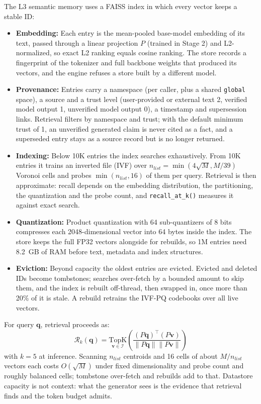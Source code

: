 \documentclass{article}
\begin{document}
The L3 semantic memory uses a FAISS index \cite{johnson2019faiss} in which every vector keeps a stable ID:
\begin{itemize}
    \item \textbf{Embedding:} Each entry is the mean-pooled base-model embedding of its text, passed through a linear projection $P$ (trained in Stage 2) and L2-normalized, so exact L2 ranking equals cosine ranking. The store records a fingerprint of the tokenizer and full backbone weights that produced its vectors, and the engine refuses a store built by a different model.
    \item \textbf{Provenance:} Entries carry a namespace (per caller, plus a shared \texttt{global} space), a source and a trust level (user-provided or external text 2, verified model output 1, unverified model output 0), a timestamp and supersession links. Retrieval filters by namespace and trust; with the default minimum trust of 1, an unverified generated claim is never cited as a fact, and a superseded entry stays as a source record but is no longer returned.
    \item \textbf{Indexing:} Below 10K entries the index searches exhaustively. From 10K entries it trains an inverted file (IVF) over $n_{list} = \min(4\sqrt{M}, M/39)$ Voronoi cells and probes $\min(n_{list}, 16)$ of them per query. Retrieval is then approximate: recall depends on the embedding distribution, the partitioning, the quantization and the probe count, and \texttt{recall\_at\_k()} measures it against exact search.
    \item \textbf{Quantization:} Product quantization with 64 sub-quantizers of 8 bits compresses each 2048-dimensional vector into 64 bytes inside the index. The store keeps the full FP32 vectors alongside for rebuilds, so 1M entries need 8.2~GB of RAM before text, metadata and index structures.
    \item \textbf{Eviction:} Beyond capacity the oldest entries are evicted. Evicted and deleted IDs become tombstones; searches over-fetch by a bounded amount to skip them, and the index is rebuilt off-thread, then swapped in, once more than 20\% of it is stale. A rebuild retrains the IVF-PQ codebooks over all live vectors.
\end{itemize}

For query $\mathbf{q}$, retrieval proceeds as:
\begin{equation}
\mathcal{R}_k(\mathbf{q}) = \underset{\mathbf{v} \in \mathcal{I}}{\text{TopK}} \left( \frac{(P\mathbf{q})^\top (P\mathbf{v})}{\|P\mathbf{q}\| \|P\mathbf{v}\|} \right)
\end{equation}
with $k=5$ at inference. Scanning $n_{list}$ centroids and 16 cells of about $M/n_{list}$ vectors each costs $O(\sqrt{M})$ under fixed dimensionality and probe count and roughly balanced cells; tombstone over-fetch and rebuilds add to that. Datastore capacity is not context: what the generator sees is the evidence that retrieval finds and the token budget admits.
\end{document}
